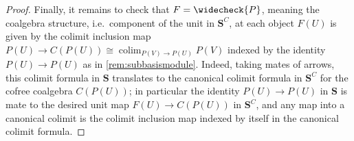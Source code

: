\documentclass[11pt, oneside, article]{memoir}
\theoremstyle{plain}
\theoremstyle{definition}
\theoremstyle{remark}
\DeclareMathOperator*{\colim}{colim}
\DeclarePairedDelimiter{\gen}{\langle}{\rangle}
\newcommand{\imp}{\Rightarrow}
\newcommand{\cat}[1]{\mathbf{#1}}
\newcommand{\CoalgOn}[2]{{#2}^{#1}}
\newcommand{\CoalgS}[1]{\CoalgOn{#1}{\bS}}
\newcommand{\lift}[1]{\widecheck{#1}}
\newcommand{\carr}{\Sigma}
\newcommand{\car}[1]{\carr^{#1}}
\newcommand{\carC}{\car{\cC}}
\newcommand{\carD}{\car{\cD}}
\newcommand{\carP}{\car{\cP}}
\newcommand{\ph}[1]{#1}
\newcommand{\com}[2]{{#1}^{#2}}
\newcommand{\cmnd}[1]{{#1}}
\newcommand{\eE}{E}
\newcommand{\xU}{U}
\newcommand{\xV}{V}
\newcommand{\hH}{h}
\newcommand{\cC}{\cmnd{C}}
\newcommand{\cD}{\cmnd{D}}
\newcommand{\bB}{\cat{B}}
\newcommand{\bC}{\cat{C}}
\newcommand{\bS}{\cat{S}}
\newcommand{\pP}{\ph{P}}
\newcommand{\cP}{\gen{\pP}}
\newcommand{\lP}{\lift{\pP}}
\newcommand{\CS}{\CoalgS{\cC}}
\newcommand{\DS}{\CoalgS{\cD}}
\begin{document}
\begin{proof}
  Finally, it remains to check that $F = \lP$, meaning the coalgebra
  structure, i.e.\ component of the unit in $\CS$, at each object
  $F(\xU)$ is given by the colimit inclusion map
  $\pP(\xU) \to \cC(\pP(\xU)) \cong \colim_{\pP(\xV) \to \pP(\xU)}
  \pP(\xV)$ indexed by the identity $\pP(\xU) \to \pP(\xU)$ as in
  \cref{rem:subbasismodule}. Indeed, taking mates of arrows, this
  colimit formula in $\bS$ translates to the canonical colimit formula
   in $\CS$ for the cofree coalgebra
  $\cC(\pP(\xU))$; in particular the identity $\pP(\xU) \to \pP(\xU)$
  in $\bS$ is mate to the desired unit map $F(\xU) \to \cC(\pP(\xU))$
  in $\CS$, and any map into a canonical colimit is the colimit
  inclusion map indexed by itself in the canonical colimit formula.
\end{proof}
\end{document}
